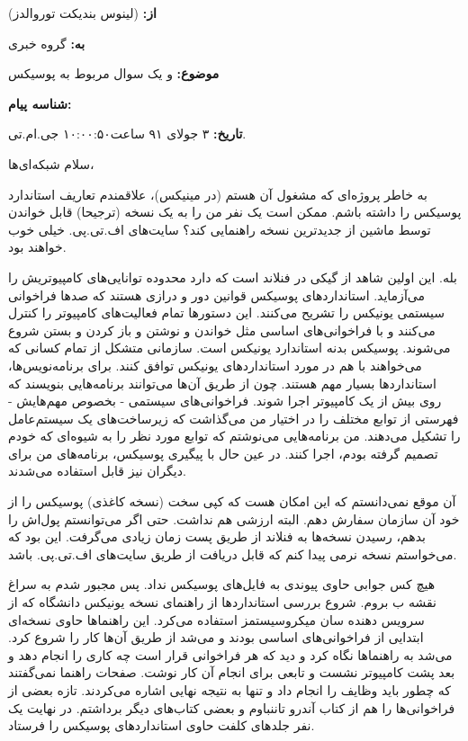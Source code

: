 \begin{emailbox}
\noindent\textbf{از:}  (لینوس بندیکت
توروالدز)

\noindent\textbf{به:} گروه خبری 

\noindent\textbf{موضوع:}  و یک سوال مربوط به پوسیکس

\noindent\textbf{شناسه پیام:}

\noindent\textbf{تاریخ:} ۳ جولای ۹۱ ساعت۱۰:۰۰:۵۰ جی.ام.تی.

\noindent سلام شبکه‌ای‌ها،

به خاطر پروژه‌ای که مشغول آن هستم (در مینیکس)، علاقمندم تعاریف
استاندارد پوسیکس را داشته باشم. ممکن است یک نفر من را به یک نسخه
(ترجیحا) قابل خواندن توسط ماشین از جدیدترین نسخه راهنمایی کند؟ سایت‌های
اف.تی.پی. خیلی خوب خواهند بود.
\end{emailbox}


بله. این اولین شاهد از گیکی در فنلاند است که دارد محدوده‌ توانایی‌های
کامپیوتریش را می‌آزماید. استانداردهای پوسیکس قوانین
دور و درازی هستند که صدها فراخوانی سیستمی یونیکس را تشریح می‌کنند. این
دستورها تمام فعالیت‌های کامپیوتر را کنترل می‌کنند و با فراخوانی‌های اساسی
مثل خواندن و نوشتن و باز کردن و بستن شروع می‌شوند. پوسیکس بدنه
استاندارد یونیکس است. سازمانی متشکل از تمام کسانی که می‌خواهند با هم در
مورد استانداردهای یونیکس توافق کنند. برای برنامه‌نویس‌ها، استانداردها
بسیار مهم هستند. چون از طریق آن‌ها می‌توانند برنامه‌هایی بنویسند که روی
بیش از یک کامپیوتر اجرا شوند. فراخوانی‌های سیستمی - بخصوص مهم‌هایش -
فهرستی از توابع مختلف را در اختیار من می‌گذاشت که زیرساخت‌های یک
سیستم‌عامل را تشکیل می‌دهند. من برنامه‌هایی می‌نوشتم که توابع مورد نظر را
به شیوه‌ای که خودم تصمیم گرفته بودم، اجرا کنند. در عین حال با پیگیری
پوسیکس، برنامه‌های من برای دیگران نیز قابل استفاده می‌شدند.

آن موقع نمی‌دانستم که این امکان هست که کپی سخت (نسخه کاغذی) پوسیکس را
از خود آن سازمان سفارش دهم. البته ارزشی هم نداشت. حتی اگر می‌توانستم
پول‌اش را بدهم، رسیدن نسخه‌ها به فنلاند از طریق پست زمان زیادی
می‌گرفت. این بود که می‌خواستم نسخه‌ نرمی پیدا کنم که قابل دریافت از طریق
سایت‌های اف.تی.پی. باشد.

هیچ کس جوابی حاوی پیوندی به فایل‌های پوسیکس نداد. پس مجبور شدم به سراغ
نقشه ب بروم. شروع بررسی استانداردها از راهنمای نسخه یونیکس دانشگاه که
از سرویس دهنده‌ سان میکروسیستمز
استفاده می‌کرد. این راهنماها حاوی نسخه‌ای ابتدایی از فراخوانی‌های اساسی
بودند و می‌شد از طریق آن‌ها کار را شروع کرد. می‌شد به راهنماها نگاه کرد و
دید که هر فراخوانی قرار است چه کاری را انجام دهد و بعد پشت کامپیوتر
نشست و تابعی برای انجام آن کار نوشت. صفحات راهنما نمی‌گفتند که چطور
باید وظایف را انجام داد و تنها به نتیجه نهایی اشاره می‌کردند. تازه بعضی
از فراخوانی‌ها را هم از کتاب آندرو تاننباوم و بعضی کتاب‌های دیگر
برداشتم. در نهایت یک نفر جلدهای کلفت حاوی استانداردهای پوسیکس را
فرستاد.

